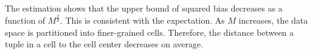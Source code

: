 The estimation shows that the upper bound of squared bias decreases as a function of $M^{\frac{2}{d}}$. This is consistent with the expectation. As $M$ increases, the data space is partitioned into finer-grained cells. Therefore, the distance between a tuple in a cell to the cell center decreases on average.


\begin{comment}
\mypara{Analyzing the bias}.
Let $x_i$ be the $i$'th dimension coordinate of a tuple $x$. Then, the bias of $\widehat{o_i}$ is
$$
\begin{array}{ll}
& \BI{\widehat{o_i}} = \EE{\widehat{o_i}}-o_i \vspace{1.5mm}
 \\
= & \EE{\frac{\sum_{t \in T} t_i (c_t + \nu_t)}{\sum_{t \in T} (c_t + \nu_t)}} - \frac{\sum_{t \in T} \sum_{x\in t} x_i }{\sum_{t \in T} c_t} \vspace{1.5mm}
 \\
\approx & \frac{\sum_{t \in T} \sum_{x\in t} (t_i-x_i) }{C},
\\
\end{array}
$$
where the last step is developed by approximating $\sum_{t \in T} (c_t + \nu_t)$ to the cluster size $C$. The bias developed in the above formula is dependent on data distribution. A precise estimation of its contribution to MSE (i.e., $\BI{\widehat{o_i}}^2$ in Equation \ref{eqn:mse}) requires to access real data. In the following, we estimate the contribution by analyzing the variance and expectation of $\BI{\widehat{o_i}} $.
$$
\EE{\BI{\widehat{o_i}}^2}  =  \Var{\BI{\widehat{o_i}}} + \left(\EE{\BI{\widehat{o_i}}}\right)^2
$$


\end{comment}
